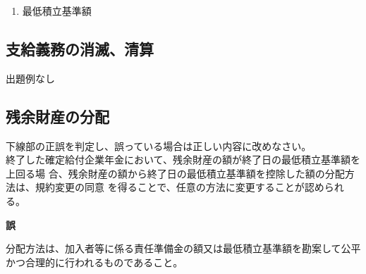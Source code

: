 \begin{answerbox}
  \begin{enumerate}[A: ]
    \item 最低積立基準額
  \end{enumerate}
\end{answerbox}


\newpage

\subsection{支給義務の消滅、清算}

出題例なし

\newpage


\subsection{残余財産の分配}

\begin{truefalse}[年金1 2018 問題2(1)\textcircled{4}]
  下線部の正誤を判定し、誤っている場合は正しい内容に改めなさい。
  \\

  終了した確定給付企業年金において、残余財産の額が終了日の最低積立基準額を上回る場
合、残余財産の額から終了日の最低積立基準額を控除した額の分配方法は、規約変更の同意
を得ることで、任意の方法に変更することが認められる。
\end{truefalse}

\begin{answerbox}
  \textbf{誤}

  分配方法は、加入者等に係る責任準備金の額又は最低積立基準額を勘案して公平かつ合理的に行われるものであること。
\end{answerbox}

\newpage
